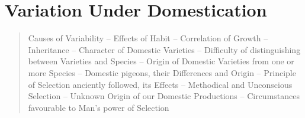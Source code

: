 \chapter{Variation Under Domestication}

\begin{quotation}
Causes of Variability -- Effects of Habit -- Correlation of Growth -- Inheritance -- Character of Domestic Varieties -- Difficulty of distinguishing between Varieties and Species -- Origin of Domestic Varieties from one or more Species -- Domestic pigeons, their Differences and Origin -- Principle of Selection anciently followed, its Effects -- Methodical and Unconscious Selection -- Unknown Origin of our Domestic Productions -- Circumstances favourable to Man's power of Selection
\end{quotation}

